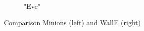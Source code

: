 \begin{figure}[htb]
\begin{subfigure}[t]{0.49\linewidth}
    \caption{"Eve"}
    \label{fig:walle}
  \end{subfigure}
  \caption{Comparison Minions (left) and WallE (right)}
  \label{fig:comparision}
\end{figure}

